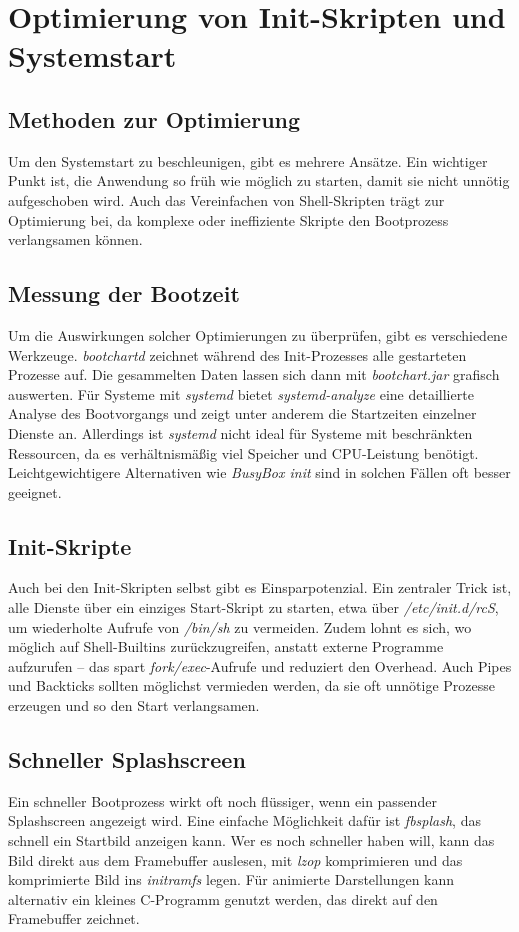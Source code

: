 
\section{Optimierung von Init-Skripten und Systemstart}

\subsection{Methoden zur Optimierung}
Um den Systemstart zu beschleunigen, gibt es mehrere Ansätze. Ein wichtiger Punkt ist, die Anwendung so früh wie möglich zu starten, damit sie nicht unnötig aufgeschoben wird. Auch das Vereinfachen von Shell-Skripten trägt zur Optimierung bei, da komplexe oder ineffiziente Skripte den Bootprozess verlangsamen können.

\subsection{Messung der Bootzeit}
Um die Auswirkungen solcher Optimierungen zu überprüfen, gibt es verschiedene Werkzeuge. \textit{bootchartd} zeichnet während des Init-Prozesses alle gestarteten Prozesse auf. Die gesammelten Daten lassen sich dann mit \textit{bootchart.jar} grafisch auswerten. Für Systeme mit \textit{systemd} bietet \textit{systemd-analyze} eine detaillierte Analyse des Bootvorgangs und zeigt unter anderem die Startzeiten einzelner Dienste an. Allerdings ist \textit{systemd} nicht ideal für Systeme mit beschränkten Ressourcen, da es verhältnismäßig viel Speicher und CPU-Leistung benötigt. Leichtgewichtigere Alternativen wie \textit{BusyBox init} sind in solchen Fällen oft besser geeignet.

\subsection{Init-Skripte}
Auch bei den Init-Skripten selbst gibt es Einsparpotenzial. Ein zentraler Trick ist, alle Dienste über ein einziges Start-Skript zu starten, etwa über \textit{/etc/init.d/rcS}, um wiederholte Aufrufe von \textit{/bin/sh} zu vermeiden. Zudem lohnt es sich, wo möglich auf Shell-Builtins zurückzugreifen, anstatt externe Programme aufzurufen – das spart \textit{fork/exec}-Aufrufe und reduziert den Overhead. Auch Pipes und Backticks sollten möglichst vermieden werden, da sie oft unnötige Prozesse erzeugen und so den Start verlangsamen.

\subsection{Schneller Splashscreen}
Ein schneller Bootprozess wirkt oft noch flüssiger, wenn ein passender Splashscreen angezeigt wird. Eine einfache Möglichkeit dafür ist \textit{fbsplash}, das schnell ein Startbild anzeigen kann. Wer es noch schneller haben will, kann das Bild direkt aus dem Framebuffer auslesen, mit \textit{lzop} komprimieren und das komprimierte Bild ins \textit{initramfs} legen. Für animierte Darstellungen kann alternativ ein kleines C-Programm genutzt werden, das direkt auf den Framebuffer zeichnet.

